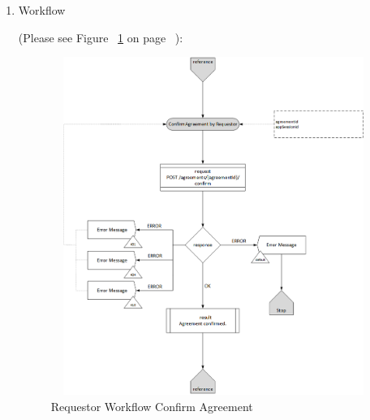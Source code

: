 \begin{enumerate}
\item Workflow

(Please see Figure ~\ref{fig:RCA} on page ~\pageref{fig:RCA}):

\begin{figure}[htbp]
    \centering
    \includegraphics[width=11cm,height=11cm,angle=0]{./diag/Workflow/Market/ConfirmAgreement-R-Workflow.png}
    \caption{Requestor Workflow Confirm Agreement  }
	\label{fig:RCA}
\end{figure}

\end{enumerate}

\newpage



